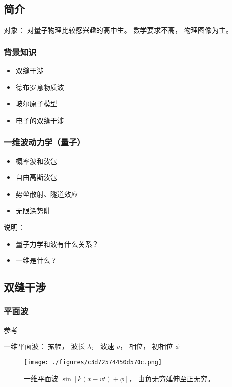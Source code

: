 
\subsection{简介}
对象： 对量子物理比较感兴趣的高中生。 数学要求不高， 物理图像为主。

\subsubsection{背景知识}
\begin{itemize}
\item 双缝干涉
\item 德布罗意物质波
\item 玻尔原子模型
\item 电子的双缝干涉
\end{itemize}

\subsubsection{一维波动力学（量子）}
\begin{itemize}
\item 概率波和波包
\item 自由高斯波包
\item 势垒散射、隧道效应
\item 无限深势阱
\end{itemize}

说明：
\begin{itemize}
\item 量子力学和波有什么关系？
\item 一维是什么？
\end{itemize}

\subsection{双缝干涉}

\subsubsection{平面波}

参考

一维平面波： 振幅， 波长 $\lambda$， 波速 $v$， 相位， 初相位 $\phi$
\begin{figure}[ht]
\centering
\texttt{[image: ./figures/c3d72574450d570c.png]}
\caption{一维平面波 $\sin[k(x-vt) + \phi]$， 由负无穷延伸至正无穷。} \label{fig_QMIntr_2}
\end{figure}

